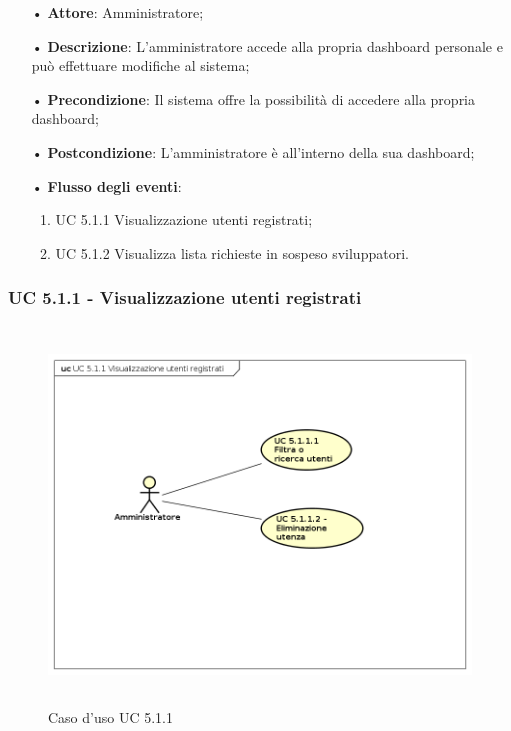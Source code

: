 \begin{itemize}
\item[•] \textbf{Attore}: Amministratore; 
\item[•] \textbf{Descrizione}: L'amministratore accede alla propria dashboard personale e può effettuare modifiche al sistema;
\item[•] \textbf{Precondizione}: Il sistema offre la possibilità di accedere alla propria dashboard;
\item[•] \textbf{Postcondizione}: L'amministratore è all'interno della sua dashboard;
\item[•] \textbf{Flusso degli eventi}:

\begin{enumerate}
\item UC 5.1.1 Visualizzazione utenti registrati;
\item UC 5.1.2 Visualizza lista richieste in sospeso sviluppatori.
\end{enumerate}

\end{itemize}
\subsubsection{UC 5.1.1 - Visualizzazione utenti registrati}

\begin{figure}[H]
\centering
\includegraphics[width=17cm, height=10cm]{img/UC511.png} 
\caption{Caso d'uso UC 5.1.1}
\end{figure}


